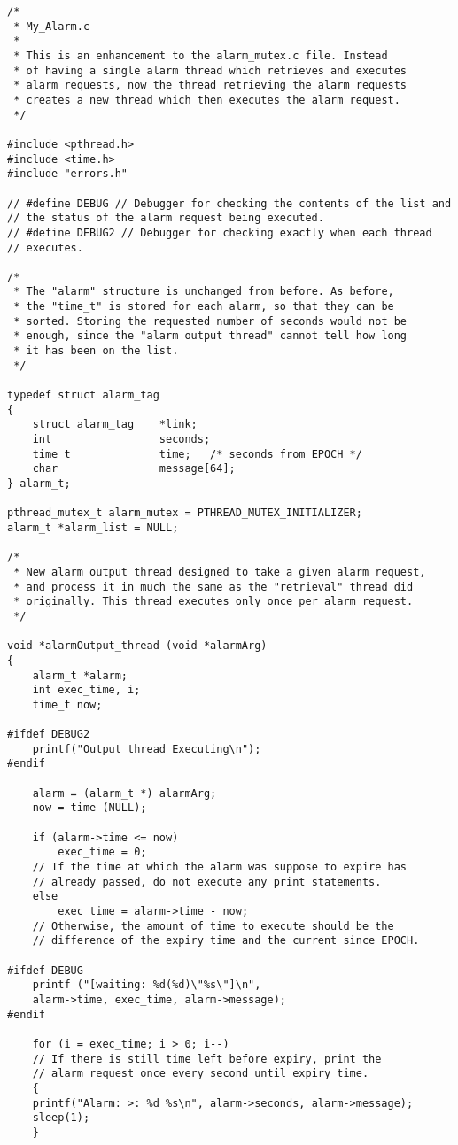 \documentclass[11pt]{article}
\begin{document}
\begin{lstlisting} 
/*
 * My_Alarm.c
 *
 * This is an enhancement to the alarm_mutex.c file. Instead
 * of having a single alarm thread which retrieves and executes
 * alarm requests, now the thread retrieving the alarm requests
 * creates a new thread which then executes the alarm request.
 */
 
#include <pthread.h>
#include <time.h>
#include "errors.h"

// #define DEBUG // Debugger for checking the contents of the list and 
// the status of the alarm request being executed.
// #define DEBUG2 // Debugger for checking exactly when each thread 
// executes.

/*
 * The "alarm" structure is unchanged from before. As before,
 * the "time_t" is stored for each alarm, so that they can be
 * sorted. Storing the requested number of seconds would not be
 * enough, since the "alarm output thread" cannot tell how long
 * it has been on the list.
 */
 
typedef struct alarm_tag
{
	struct alarm_tag    *link;
    int                 seconds;
    time_t              time;   /* seconds from EPOCH */
    char                message[64];
} alarm_t;

pthread_mutex_t alarm_mutex = PTHREAD_MUTEX_INITIALIZER;
alarm_t *alarm_list = NULL;

/*
 * New alarm output thread designed to take a given alarm request,
 * and process it in much the same as the "retrieval" thread did
 * originally. This thread executes only once per alarm request.
 */
 
void *alarmOutput_thread (void *alarmArg)
{
	alarm_t *alarm;
    int exec_time, i;
    time_t now;
    
#ifdef DEBUG2
	printf("Output thread Executing\n");
#endif

    alarm = (alarm_t *) alarmArg;
    now = time (NULL);
    
    if (alarm->time <= now) 
        exec_time = 0;
	// If the time at which the alarm was suppose to expire has
	// already passed, do not execute any print statements.
    else 
        exec_time = alarm->time - now;
	// Otherwise, the amount of time to execute should be the 
	// difference of the expiry time and the current since EPOCH.

#ifdef DEBUG
    printf ("[waiting: %d(%d)\"%s\"]\n", 
	alarm->time, exec_time, alarm->message);
#endif

	for (i = exec_time; i > 0; i--) 
	// If there is still time left before expiry, print the 
	// alarm request once every second until expiry time.
	{
	printf("Alarm: >: %d %s\n", alarm->seconds, alarm->message);
	sleep(1);
	}


\end{lstlisting}
\end{document}

